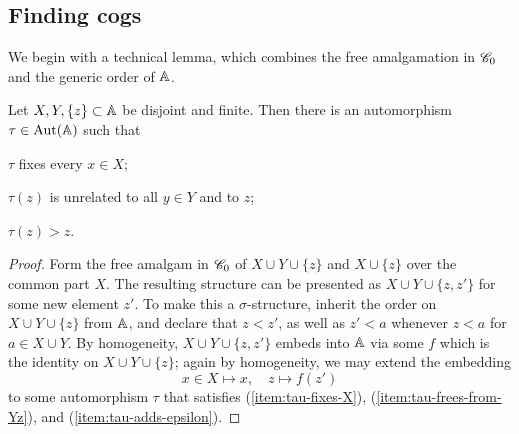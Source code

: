 \subsection{Finding cogs}\label{subsec:finding-cogs}
We begin with a technical lemma, which combines the free amalgamation in $\mathscr{C}_0$ and the generic order of $\mathbb{A}$.
\begin{lemma}\label{lem:free-fresh}
    Let $X, Y, \{z\} \subset \mathbb{A}$ be disjoint and finite.
    Then there is an automorphism $\tau \in \operatorname{Aut}(\mathbb{A})$ such that
    \begin{bracketenumerate}
        \item\label{item:tau-fixes-X} 
        $\tau$ fixes every $x \in X$;

        \item\label{item:tau-frees-from-Yz} 
        $\tau(z)$ is unrelated to all $y \in Y$ and to $z$;
        
        \item\label{item:tau-adds-epsilon} 
        $\tau(z) > z$.
    \end{bracketenumerate}
\end{lemma}
\begin{proof}
Form the free amalgam in ${\mathscr{C}}_0$ of $X\cup Y\cup\{z\}$ and $X\cup\{z\}$ over the common part $X$. The resulting structure can be presented as  $X\cup Y\cup\{z,z'\}$ for some new element $z'$. To make this a $\sigma$-structure, inherit the order on $X \cup Y \cup \{z\}$ from $\mathbb{A}$, and declare that $z < z'$, as well as $z' < a$ whenever $z<a$ for $a\in X \cup Y$. By homogeneity, $X \cup Y \cup \{z, z'\}$ embeds into $\mathbb{A}$ via some $f$ which is the identity on $X \cup Y \cup \{z\}$;
again by homogeneity, we may extend the embedding 
\[          x \in X \mapsto x, \quad z \mapsto f(z')     \] 
to some automorphism $\tau$ that satisfies (\ref{item:tau-fixes-X}), (\ref{item:tau-frees-from-Yz}), and (\ref{item:tau-adds-epsilon}).
\end{proof}
